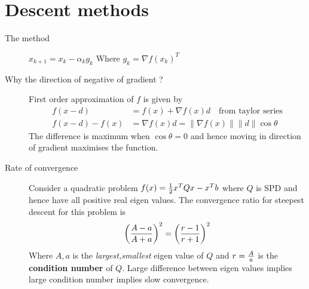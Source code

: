 \section{Descent methods}
\begin{slidemaximus}
	\begin{description}
	\item[The method]
	$x_{k+1} = x_k - \alpha_kg_k$
	Where $g_k = \nabla f(x_k)^T$

	\item[Why the direction of negative of gradient ?]
	First order approximation of $f$ is given by
	\begin{align*}
		f(x-d) &= f(x) + \nabla f(x) d\quad \text{from taylor series}
		\\
		f(x-d) - f(x) &= \nabla f(x) d = \|\nabla f(x)\|\|d\|\cos \theta
	\end{align*}
	The difference is maximum when $\cos \theta = 0$ and hence moving in direction of gradient maximises the function.
	\item[Rate of convergence] Consider a quadratic problem $f(x) = {1\over 2} x^TQx -x^Tb$ where $Q$ is SPD and hence have all positive real eigen values. The convergence ratio for steepest descent for this problem is  
	$$\left(A-a\over A+a\right)^2 = \left(r-1\over r+1 \right)^2$$ 
	Where $A,a$ is the \emph{largest,smallest} eigen value of $Q$ and $r = {A\over a}$ is the \textbf{condition number} of $Q$. Large difference between eigen values implies large condition number implies slow convergence.
	\end{description}
\end{slidemaximus}

